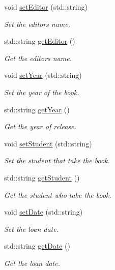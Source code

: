 \begin{DoxyCompactItemize}
void \hyperlink{classBook_a463af516921d49d46b730c455b2de0c3}{set\+Editor} (std\+::string)
\begin{DoxyCompactList}\small\item\em Set the editor\textquotesingle{}s name. \end{DoxyCompactList}\item 
std\+::string \hyperlink{classBook_a8df0e201c23d298f20bc4f36f74ac728}{get\+Editor} ()
\begin{DoxyCompactList}\small\item\em Get the editor\textquotesingle{}s name. \end{DoxyCompactList}\item 
void \hyperlink{classBook_a3383a947b8522adc83e16afecba914be}{set\+Year} (std\+::string)
\begin{DoxyCompactList}\small\item\em Set the year of the book. \end{DoxyCompactList}\item 
std\+::string \hyperlink{classBook_a933b321fec5c6c8bbe39e9d2c0b3de2d}{get\+Year} ()
\begin{DoxyCompactList}\small\item\em Get the year of release. \end{DoxyCompactList}\item 
void \hyperlink{classBook_a92bee3d10d8372e002684c018462dc4c}{set\+Student} (std\+::string)
\begin{DoxyCompactList}\small\item\em Set the student that take the book. \end{DoxyCompactList}\item 
std\+::string \hyperlink{classBook_ae5e61d969f34faf755921a397bdfaf20}{get\+Student} ()
\begin{DoxyCompactList}\small\item\em Get the student who take the book. \end{DoxyCompactList}\item 
void \hyperlink{classBook_a8e0cf166c4e0b5f412d0b472f83e6972}{set\+Date} (std\+::string)
\begin{DoxyCompactList}\small\item\em Set the loan date. \end{DoxyCompactList}\item 
std\+::string \hyperlink{classBook_a23a3ee3588cc83853c02182afbb5842e}{get\+Date} ()
\begin{DoxyCompactList}\small\item\em Get the loan date. \end{DoxyCompactList}\item 

\end{DoxyCompactItemize}
